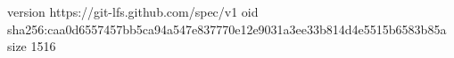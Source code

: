 version https://git-lfs.github.com/spec/v1
oid sha256:caa0d6557457bb5ca94a547e837770e12e9031a3ee33b814d4e5515b6583b85a
size 1516
